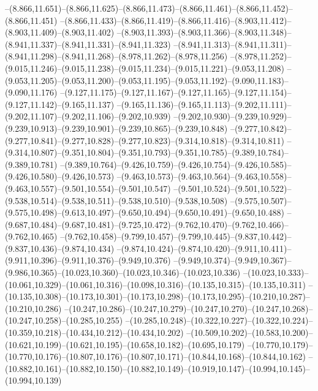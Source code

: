   --(8.866,11.651)--(8.866,11.625)--(8.866,11.473)--(8.866,11.461)--(8.866,11.452)--(8.866,11.451)%
  --(8.866,11.433)--(8.866,11.419)--(8.866,11.416)--(8.903,11.412)--(8.903,11.409)--(8.903,11.402)%
  --(8.903,11.393)--(8.903,11.366)--(8.903,11.348)--(8.941,11.337)--(8.941,11.331)--(8.941,11.323)%
  --(8.941,11.313)--(8.941,11.311)--(8.941,11.298)--(8.941,11.268)--(8.978,11.262)--(8.978,11.256)%
  --(8.978,11.252)--(9.015,11.246)--(9.015,11.238)--(9.015,11.234)--(9.015,11.221)--(9.053,11.208)%
  --(9.053,11.205)--(9.053,11.200)--(9.053,11.195)--(9.053,11.192)--(9.090,11.183)--(9.090,11.176)%
  --(9.127,11.175)--(9.127,11.167)--(9.127,11.165)--(9.127,11.154)--(9.127,11.142)--(9.165,11.137)%
  --(9.165,11.136)--(9.165,11.113)--(9.202,11.111)--(9.202,11.107)--(9.202,11.106)--(9.202,10.939)%
  --(9.202,10.930)--(9.239,10.929)--(9.239,10.913)--(9.239,10.901)--(9.239,10.865)--(9.239,10.848)%
  --(9.277,10.842)--(9.277,10.841)--(9.277,10.828)--(9.277,10.823)--(9.314,10.818)--(9.314,10.811)%
  --(9.314,10.807)--(9.351,10.804)--(9.351,10.793)--(9.351,10.785)--(9.389,10.784)--(9.389,10.781)%
  --(9.389,10.764)--(9.426,10.759)--(9.426,10.754)--(9.426,10.585)--(9.426,10.580)--(9.426,10.573)%
  --(9.463,10.573)--(9.463,10.564)--(9.463,10.558)--(9.463,10.557)--(9.501,10.554)--(9.501,10.547)%
  --(9.501,10.524)--(9.501,10.522)--(9.538,10.514)--(9.538,10.511)--(9.538,10.510)--(9.538,10.508)%
  --(9.575,10.507)--(9.575,10.498)--(9.613,10.497)--(9.650,10.494)--(9.650,10.491)--(9.650,10.488)%
  --(9.687,10.484)--(9.687,10.481)--(9.725,10.472)--(9.762,10.470)--(9.762,10.466)--(9.762,10.465)%
  --(9.762,10.458)--(9.799,10.457)--(9.799,10.445)--(9.837,10.442)--(9.837,10.436)--(9.874,10.434)%
  --(9.874,10.424)--(9.874,10.420)--(9.911,10.411)--(9.911,10.396)--(9.911,10.376)--(9.949,10.376)%
  --(9.949,10.374)--(9.949,10.367)--(9.986,10.365)--(10.023,10.360)--(10.023,10.346)--(10.023,10.336)%
  --(10.023,10.333)--(10.061,10.329)--(10.061,10.316)--(10.098,10.316)--(10.135,10.315)--(10.135,10.311)%
  --(10.135,10.308)--(10.173,10.301)--(10.173,10.298)--(10.173,10.295)--(10.210,10.287)--(10.210,10.286)%
  --(10.247,10.286)--(10.247,10.279)--(10.247,10.270)--(10.247,10.268)--(10.247,10.258)--(10.285,10.255)%
  --(10.285,10.248)--(10.322,10.227)--(10.322,10.224)--(10.359,10.218)--(10.434,10.212)--(10.434,10.202)%
  --(10.509,10.202)--(10.583,10.200)--(10.621,10.199)--(10.621,10.195)--(10.658,10.182)--(10.695,10.179)%
  --(10.770,10.179)--(10.770,10.176)--(10.807,10.176)--(10.807,10.171)--(10.844,10.168)--(10.844,10.162)%
  --(10.882,10.161)--(10.882,10.150)--(10.882,10.149)--(10.919,10.147)--(10.994,10.145)--(10.994,10.139)%
